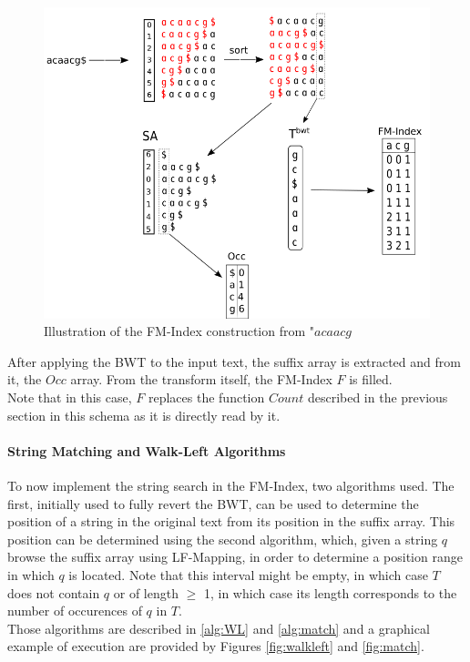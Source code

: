 \begin{minipage}{0.5\textwidth}
\begin{figure}[H]
    \hspace{-15mm}\includegraphics[scale = 0.35]{Figures/FMIndex.png}
    \caption{Illustration of the FM-Index construction from "$acaacg$}
    \label{fig:fmindex}
\end{figure}
\end{minipage}
\hspace{15mm}
\begin{minipage}{0.3\textwidth}
After applying the BWT to the input text, the suffix array is extracted and from it, the $Occ$ array. From the transform itself, the FM-Index $F$ is filled. \\
Note that in this case, $F$ replaces the function $Count$ described in the previous section in this schema as it is directly read by it.
\end{minipage}


\paragraph{String Matching and Walk-Left Algorithms} To now implement the string search in the FM-Index, two algorithms used. The first, initially used to fully revert the BWT, can be used to determine the position of a string in the original text from its position in the suffix array. This position can be determined using the second algorithm, which, given a string $q$ browse the suffix array using LF-Mapping, in order to determine a position range in which $q$ is located. Note that this interval might be empty, in which case $T$ does not contain $q$ or of length $\geq$ 1, in which case its length corresponds to the number of occurences of $q$ in $T$. \\
Those algorithms are described in \ref{alg:WL} and \ref{alg:match} and a graphical example of execution are provided by Figures \ref{fig:walkleft} and \ref{fig:match}.

